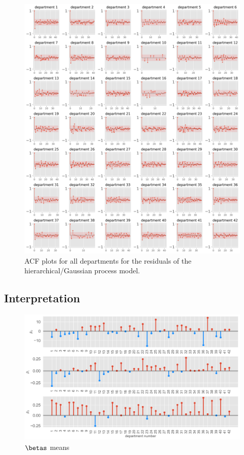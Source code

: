 \documentclass[paper=a4, fontsize=11pt]{scrartcl}
\begin{document}
\begin{figure}[!htb]\label{autocorr_after}
\centering
\includegraphics[width=1\textwidth]{acf_plots_after.png}
\caption{ACF plots for all departments for the residuals of the hierarchical/Gaussian process model.}
\end{figure}



\subsection{Interpretation}


\begin{figure}[!htb]\label{corr_mat}
\centering
\includegraphics[width=1\textwidth]{project/writeup/mean_betas.png}
\caption{$\betas$ means}\end{figure}
\end{document}
